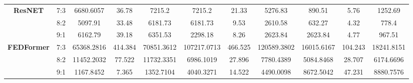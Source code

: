 \documentclass[conference]{IEEEtran}
\begin{document}
\begin{table}
\begin{adjustbox}{center=\textwidth}
\begin{tabular}{|c|c|c|c|c|c|c|c|c|c|c|}
        \multirow{3}{*}{\textbf{ResNET}} 
            & 7:3 & 6680.6057 & 36.78 & 7215.2 & 7215.2 & 21.33 & 5276.83 & 890.51 & 5.76 & 1252.69 \\
            & 8:2 & 5097.91 & 33.48 & 6181.73 & 6181.73 & 9.53 & 2610.58 & 632.27 & 4.32 & 778.4 \\
            & 9:1 & 6162.79 & 39.18 & 6351.53 & 2298.18 & 8.26 & 2623.84 & 2623.84 & 4.77 & 967.51 \\ \hline
        \multirow{3}{*}{\textbf{FEDFormer}} 
            & 7:3 & 65368.2816 & 414.384 & 70851.3612 & 107217.0713 & 466.525 & 120589.3802 & 16015.6167 & 104.243 & 18241.8151 \\
            & 8:2 & 11452.2032 & 77.522 & 11732.3351 & 6986.1019 & 27.896 & 7780.4389 & 5084.8468 & 28.707 & 6174.6696 \\
            & 9:1 & 1167.8452 & 7.365 & 1352.7104 & 4040.3271 & 14.522 & 4490.0098 & 8672.5042 & 47.231 & 8880.7576 \\ \hline
    \end{tabular}
    \end{adjustbox}
\end{table}



\end{document}
